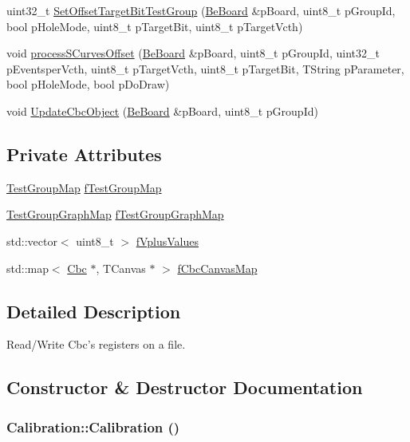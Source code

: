 \begin{CompactItemize}
uint32\_\-t \hyperlink{class_calibration_e61d5cd4dfc7b3725ee2f5d734860627}{Set\-Offset\-Target\-Bit\-Test\-Group} (\hyperlink{class_ph2___hw_description_1_1_be_board}{Be\-Board} \&p\-Board, uint8\_\-t p\-Group\-Id, bool p\-Hole\-Mode, uint8\_\-t p\-Target\-Bit, uint8\_\-t p\-Target\-Vcth)
\item 
void \hyperlink{class_calibration_29f921b720db68af7b1a889263aaac2a}{process\-SCurves\-Offset} (\hyperlink{class_ph2___hw_description_1_1_be_board}{Be\-Board} \&p\-Board, uint8\_\-t p\-Group\-Id, uint32\_\-t p\-Eventsper\-Vcth, uint8\_\-t p\-Target\-Vcth, uint8\_\-t p\-Target\-Bit, TString p\-Parameter, bool p\-Hole\-Mode, bool p\-Do\-Draw)
\item 
void \hyperlink{class_calibration_e68b10877c53dc83483e90391ce4b9ac}{Update\-Cbc\-Object} (\hyperlink{class_ph2___hw_description_1_1_be_board}{Be\-Board} \&p\-Board, uint8\_\-t p\-Group\-Id)
\end{CompactItemize}
\subsection*{Private Attributes}
\begin{CompactItemize}
\item 
\hyperlink{_channel_8h_1fc681fc13cd077738e86a5fbc1104d4}{Test\-Group\-Map} \hyperlink{class_calibration_c79d5ebc2766ebc9c5faf384a05581b0}{f\-Test\-Group\-Map}
\item 
\hyperlink{_channel_8h_1be8cf31d2544b84debee2220beeb318}{Test\-Group\-Graph\-Map} \hyperlink{class_calibration_7598aa1e8dab58e452923e54909f8a8e}{f\-Test\-Group\-Graph\-Map}
\item 
std::vector$<$ uint8\_\-t $>$ \hyperlink{class_calibration_d6fedaf43e799f69b7fd46d9347cc536}{f\-Vplus\-Values}
\item 
std::map$<$ \hyperlink{class_ph2___hw_description_1_1_cbc}{Cbc} $\ast$, TCanvas $\ast$ $>$ \hyperlink{class_calibration_e47a517af22b6c01652d8f5d5bd3ae20}{f\-Cbc\-Canvas\-Map}
\end{CompactItemize}


\subsection{Detailed Description}
Read/Write Cbc's registers on a file. 



\subsection{Constructor \& Destructor Documentation}
\hypertarget{class_calibration_80f51a5ff7ec0f44d5388c9a61d1f20b}{
\subsubsection[Calibration]{\setlength{\rightskip}{0pt plus 5cm}Calibration::Calibration ()}}
\label{class_calibration_80f51a5ff7ec0f44d5388c9a61d1f20b}


